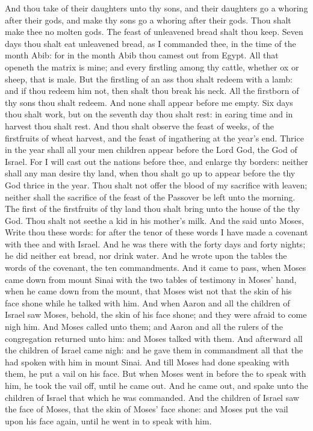 \begin{biblechapter}
\verse And thou take of their daughters unto thy sons, and their daughters go a whoring after their gods, and make thy sons go a whoring after their gods.
\verse Thou shalt make thee no molten gods.
\verse The feast of unleavened bread shalt thou keep. Seven days thou shalt eat unleavened bread, as I commanded thee, in the time of the month Abib: for in the month Abib thou camest out from Egypt.
\verse All that openeth the matrix is mine; and every firstling among thy cattle, whether ox or sheep, that is male.
\verse But the firstling of an ass thou shalt redeem with a lamb: and if thou redeem him not, then shalt thou break his neck. All the firstborn of thy sons thou shalt redeem. And none shall appear before me empty.
\verse Six days thou shalt work, but on the seventh day thou shalt rest: in earing time and in harvest thou shalt rest.
\verse And thou shalt observe the feast of weeks, of the firstfruits of wheat harvest, and the feast of ingathering at the year's end.
\verse Thrice in the year shall all your men children appear before the Lord God, the God of Israel.
\verse For I will cast out the nations before thee, and enlarge thy borders: neither shall any man desire thy land, when thou shalt go up to appear before the \LORD thy God thrice in the year.
\verse Thou shalt not offer the blood of my sacrifice with leaven; neither shall the sacrifice of the feast of the Passover be left unto the morning.
\verse The first of the firstfruits of thy land thou shalt bring unto the house of the \LORD thy God. Thou shalt not seethe a kid in his mother's milk.
\verse And the \LORD said unto Moses, Write thou these words: for after the tenor of these words I have made a covenant with thee and with Israel.
\verse And he was there with the \LORD forty days and forty nights; he did neither eat bread, nor drink water. And he wrote upon the tables the words of the covenant, the ten commandments.
 And it came to pass, when Moses came down from mount Sinai with the two tables of testimony in Moses' hand, when he came down from the mount, that Moses wist not that the skin of his face shone while he talked with him.
\verse And when Aaron and all the children of Israel saw Moses, behold, the skin of his face shone; and they were afraid to come nigh him.
\verse And Moses called unto them; and Aaron and all the rulers of the congregation returned unto him: and Moses talked with them.
\verse And afterward all the children of Israel came nigh: and he gave them in commandment all that the \LORD had spoken with him in mount Sinai.
\verse And till Moses had done speaking with them, he put a vail on his face.
\verse But when Moses went in before the \LORD to speak with him, he took the vail off, until he came out. And he came out, and spake unto the children of Israel that which he was commanded.
\verse And the children of Israel saw the face of Moses, that the skin of Moses' face shone: and Moses put the vail upon his face again, until he went in to speak with him.
\end{biblechapter}


